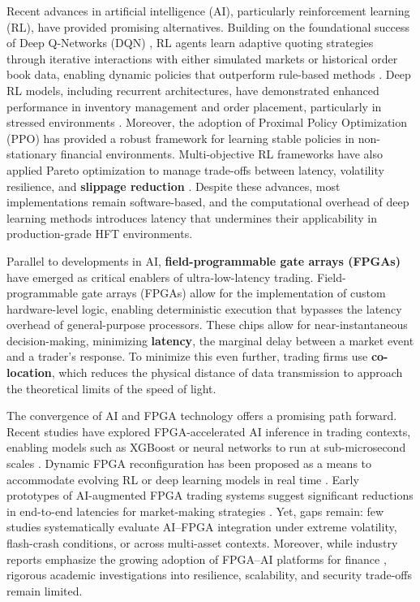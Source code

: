  
 Recent advances in artificial intelligence (AI), particularly reinforcement learning (RL), have provided promising alternatives. Building on the foundational success of Deep Q-Networks (DQN) \citep{Mnih2015}, RL agents learn adaptive quoting strategies through iterative interactions with either simulated markets or historical order book data, enabling dynamic policies that outperform rule-based methods \citep{Arulkumaran2017,Spooner2020,Kumar2023}. Deep RL models, including recurrent architectures, have demonstrated enhanced performance in inventory management and order placement, particularly in stressed environments \citep{Vakkilainen2023,Jiang2025}. Moreover, the adoption of Proximal Policy Optimization (PPO) \citep{Schulman2017} has provided a robust framework for learning stable policies in non-stationary financial environments. Multi-objective RL frameworks have also applied Pareto optimization to manage trade-offs between latency, volatility resilience, and \textbf{slippage reduction} \citep{Li2025}.
  Despite these advances, most implementations remain software-based, and the computational overhead of deep learning methods introduces latency that undermines their applicability in production-grade HFT environments. 


Parallel to developments in AI, \textbf{field-programmable gate arrays (FPGAs)} have emerged as critical enablers of ultra-low-latency trading. Field-programmable gate arrays (FPGAs) allow for the implementation of custom hardware-level logic, enabling deterministic execution that bypasses the latency overhead of general-purpose processors. These chips allow for near-instantaneous decision-making, minimizing \textbf{latency}, the marginal delay between a market event and a trader's response. To minimize this even further, trading firms use \textbf{co-location}, which reduces the physical distance of data transmission to approach the theoretical limits of the speed of light.


The convergence of AI and FPGA technology offers a promising path forward. Recent studies have explored FPGA-accelerated AI inference in trading contexts, enabling models such as XGBoost or neural networks to run at sub-microsecond scales \citep{NapatechND,Fidus2024}. Dynamic FPGA reconfiguration has been proposed as a means to accommodate evolving RL or deep learning models in real time \citep{Aouini2025}. Early prototypes of AI-augmented FPGA trading systems suggest significant reductions in end-to-end latencies for market-making strategies \citep{Lee2023,Kuzmanovic2023}. Yet, gaps remain: few studies systematically evaluate AI–FPGA integration under extreme volatility, flash-crash conditions, or across multi-asset contexts. Moreover, while industry reports emphasize the growing adoption of FPGA–AI platforms for finance \citep{Markets2025,Lattice2025}, rigorous academic investigations into resilience, scalability, and security trade-offs remain limited. 



